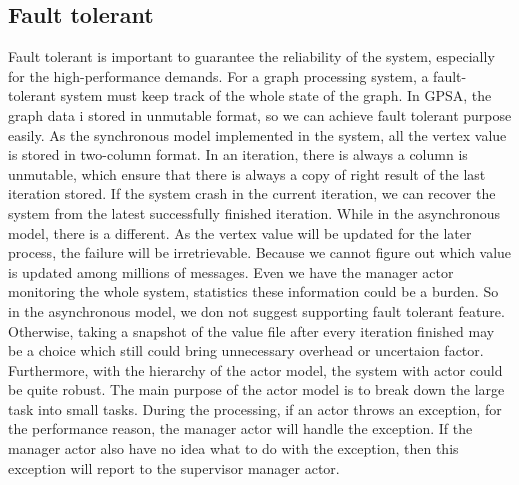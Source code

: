 \documentclass[twocolumn,a4paper,10pt]{article}
\begin{document}
\subsection{Fault tolerant}
Fault tolerant is important to guarantee the reliability of the system, especially for the high-performance demands. For a graph processing system, a fault-tolerant system must keep track of the whole state of the graph. In GPSA, the graph data i stored in unmutable format, so we can achieve fault tolerant purpose easily. As the synchronous model implemented in the system, all the vertex value is stored  in two-column format. In an iteration, there is always a column is unmutable, which ensure that there is always a copy of right result of the last iteration stored. If the system crash in the current iteration, we can recover the system from the latest successfully finished iteration. While in the asynchronous model, there is a different. As the vertex value will be updated for the later process, the failure will be irretrievable. Because we cannot figure out which value is updated among millions of messages. 
Even we have the manager actor monitoring the whole system, statistics these information could be a burden.  So in the asynchronous model, we don not suggest supporting fault tolerant feature. Otherwise, taking a snapshot of the value file after every iteration finished may be a choice which still could bring unnecessary overhead or uncertaion factor. Furthermore, with the hierarchy of the actor model, the system with actor could be quite robust. The main purpose of the actor model is to break down the large task into small tasks. During the processing, if an actor throws an exception, for the performance reason, the manager actor will handle the exception. If the manager actor also have no idea what to do with the exception, then this exception will report to the supervisor manager actor. \newline
\end{document}
